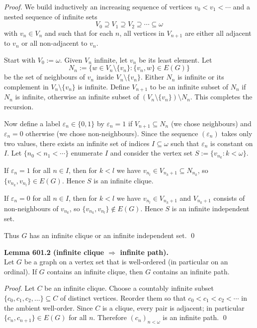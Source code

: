 \noindent\emph{Proof.}
We build inductively an increasing sequence of vertices $v_0<v_1<\cdots$ and a nested sequence of infinite sets
\[
V_0\supseteq V_1\supseteq V_2\supseteq\cdots\subseteq\omega
\]
with $v_n\in V_n$ and such that for each $n$, all vertices in $V_{n+1}$ are either all adjacent to $v_n$ or all non-adjacent to $v_n$.

Start with $V_0:=\omega$. Given $V_n$ infinite, let $v_n$ be its least element.
Let
\[
N_n := \{w\in V_n\setminus\{v_n\}: \{v_n,w\}\in E(G)\}
\]
be the set of neighbours of $v_n$ inside $V_n\setminus\{v_n\}$. Either $N_n$ is infinite or its complement in $V_n\setminus\{v_n\}$ is infinite.
Define $V_{n+1}$ to be an infinite subset of $N_n$ if $N_n$ is infinite, otherwise an infinite subset of $(V_n\setminus\{v_n\})\setminus N_n$.
This completes the recursion.

Now define a label $\varepsilon_n\in\{0,1\}$ by $\varepsilon_n=1$ if $V_{n+1}\subseteq N_n$ (we chose neighbours) and $\varepsilon_n=0$ otherwise (we chose non-neighbours).
Since the sequence $(\varepsilon_n)$ takes only two values, there exists an infinite set of indices $I\subseteq\omega$ such that $\varepsilon_n$ is constant on $I$.
Let $\{n_0<n_1<\cdots\}$ enumerate $I$ and consider the vertex set $S:=\{v_{n_k}:k<\omega\}$.

If $\varepsilon_n=1$ for all $n\in I$, then for $k<l$ we have $v_{n_l}\in V_{n_k+1}\subseteq N_{n_k}$, so $\{v_{n_k},v_{n_l}\}\in E(G)$. Hence $S$ is an infinite clique.

If $\varepsilon_n=0$ for all $n\in I$, then for $k<l$ we have $v_{n_l}\in V_{n_k+1}$ and $V_{n_k+1}$ consists of non-neighbours of $v_{n_k}$, so $\{v_{n_k},v_{n_l}\}\notin E(G)$. Hence $S$ is an infinite independent set.

Thus $G$ has an infinite clique or an infinite independent set. \qed

\medskip
\noindent\textbf{Lemma 601.2 (infinite clique $\Rightarrow$ infinite path).}\\
Let $G$ be a graph on a vertex set that is well-ordered (in particular on an ordinal). If $G$ contains an infinite clique, then $G$ contains an infinite path.

\noindent\emph{Proof.}
Let $C$ be an infinite clique. Choose a countably infinite subset $\{c_0,c_1,c_2,\dots\}\subseteq C$ of distinct vertices.
Reorder them so that $c_0<c_1<c_2<\cdots$ in the ambient well-order.
Since $C$ is a clique, every pair is adjacent; in particular $\{c_n,c_{n+1}\}\in E(G)$ for all $n$. Therefore $(c_n)_{n<\omega}$ is an infinite path. \qed

